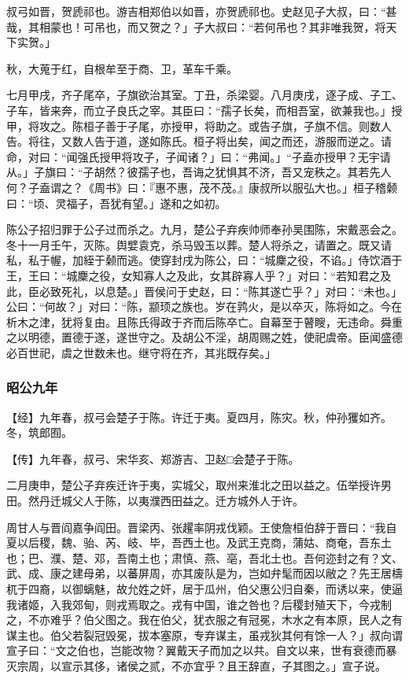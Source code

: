 \documentclass[]{article}
\begin{document}
叔弓如晋，贺虒祁也。游吉相郑伯以如晋，亦贺虒祁也。史赵见子大叔，曰：``甚哉，其相蒙也！可吊也，而又贺之？」子大叔曰：``若何吊也？其非唯我贺，将天下实贺。」

秋，大蒐于红，自根牟至于商、卫，革车千乘。

七月甲戌，齐子尾卒，子旗欲治其室。丁丑，杀梁婴。八月庚戌，逐子成、子工、子车，皆来奔，而立子良氏之宰。其臣曰：``孺子长矣，而相吾室，欲兼我也。」授甲，将攻之。陈桓子善于子尾，亦授甲，将助之。或告子旗，子旗不信。则数人告。将往，又数人告于道，遂如陈氏。桓子将出矣，闻之而还，游服而逆之。请命，对曰：``闻强氏授甲将攻子，子闻诸？」曰：``弗闻。」``子盍亦授甲？无宇请从。」子旗曰：``子胡然？彼孺子也，吾诲之犹惧其不济，吾又宠秩之。其若先人何？子盍谓之？《周书》曰：『惠不惠，茂不茂。』康叔所以服弘大也。」桓子稽颡曰：``顷、灵福子，吾犹有望。」遂和之如初。

陈公子招归罪于公子过而杀之。九月，楚公子弃疾帅师奉孙吴围陈，宋戴恶会之。冬十一月壬午，灭陈。舆嬖袁克，杀马毁玉以葬。楚人将杀之，请置之。既又请私，私于幄，加絰于颡而逃。使穿封戌为陈公，曰：``城麇之役，不谄。」侍饮酒于王，王曰：``城麇之役，女知寡人之及此，女其辟寡人乎？」对曰：``若知君之及此，臣必致死礼，以息楚。」晋侯问于史赵，曰：``陈其遂亡乎？」对曰：``未也。」公曰：``何故？」对曰：``陈，颛顼之族也。岁在鹑火，是以卒灭，陈将如之。今在析木之津，犹将复由。且陈氏得政于齐而后陈卒亡。自幕至于瞽瞍，无违命。舜重之以明德，置德于遂，遂世守之。及胡公不淫，胡周赐之姓，使祀虞帝。臣闻盛德必百世祀，虞之世数未也。继守将在齐，其兆既存矣。」

\hypertarget{header-n2514}{%
\subsubsection{昭公九年}\label{header-n2514}}

【经】九年春，叔弓会楚子于陈。许迁于夷。夏四月，陈灾。秋，仲孙玃如齐。冬，筑郎囿。

【传】九年春，叔弓、宋华亥、郑游吉、卫赵□会楚子于陈。

二月庚申，楚公子弃疾迁许于夷，实城父，取州来淮北之田以益之。伍举授许男田。然丹迁城父人于陈，以夷濮西田益之。迁方城外人于许。

周甘人与晋阎嘉争阎田。晋梁丙、张趯率阴戎伐颖。王使詹桓伯辞于晋曰：``我自夏以后稷，魏、骀、芮、岐、毕，吾西土也。及武王克商，蒲姑、商奄，吾东土也；巴、濮、楚、邓，吾南土也；肃慎、燕、亳，吾北土也。吾何迩封之有？文、武、成、康之建母弟，以蕃屏周，亦其废队是为，岂如弁髦而因以敝之？先王居檮杌于四裔，以御螭魅，故允姓之奸，居于瓜州，伯父惠公归自秦，而诱以来，使逼我诸姬，入我郊甸，则戎焉取之。戎有中国，谁之咎也？后稷封殖天下，今戎制之，不亦难乎？伯父图之。我在伯父，犹衣服之有冠冕，木水之有本原，民人之有谋主也。伯父若裂冠毁冕，拔本塞原，专弃谋主，虽戎狄其何有馀一人？」叔向谓宣子曰：``文之伯也，岂能改物？翼戴天子而加之以共。自文以来，世有衰德而暴灭宗周，以宣示其侈，诸侯之贰，不亦宜乎？且王辞直，子其图之。」宣子说。
\end{document}
